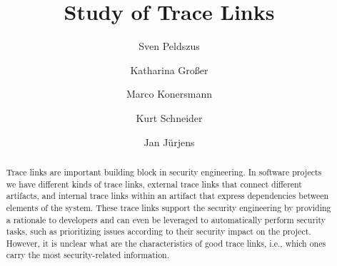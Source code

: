 \documentclass[acmsmall,screen,review,anonymous,authoryear]{acmart}
\newcommand{\papertitle}{Study of Trace Links}
\begin{document}
\title[\papertitle]{\papertitle}

\author[S. Peldszus]{Sven Peldszus}

\author[K. Großer]{Katharina Großer}

\author[M. Konersmann]{Marco Konersmann}

\author[K. Schneider]{Kurt Schneider}

\author[J. Jürjens]{Jan Jürjens}


%
\begin{abstract}
	Trace links are important building block in security engineering.
	In software projects we have different kinds of trace links, external trace links that connect different artifacts, and internal trace links within an artifact that express dependencies between elements of the system.
	These trace links support the security engineering by providing a rationale to developers and can even be leveraged to automatically perform security tasks, such as prioritizing issues according to their security impact on the project.
	However, it is unclear what are the characteristics of good trace links, i.e., which ones carry the most security-related information.
\end{abstract}
\end{document}
